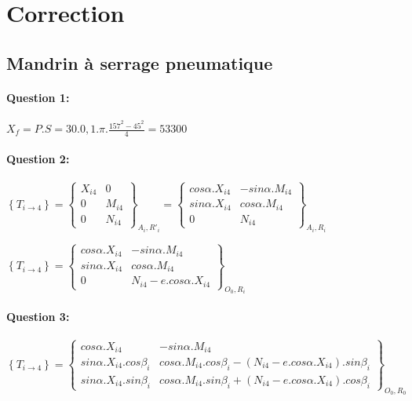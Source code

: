 \ifdef{\public}{}{}

\newpage

\section{Correction}

\subsection{Mandrin à serrage pneumatique}

\paragraph{Question 1:}

$X_f=P.S=30.0,1.\pi.\frac{157^2-45^2}{4}=53300$

\paragraph{Question 2:}

$\left\{T_{i\rightarrow 4}\right\}=\left\{\begin{array}{cc}
X_{i4} & 0 \\ 0 & M_{i4} \\  0 & N_{i4}
\end{array}\right\}_{A_i,R'_i}=\left\{\begin{array}{cc}
cos\alpha.X_{i4} & -sin\alpha.M_{i4} \\ sin\alpha.X_{i4} & cos\alpha.M_{i4} \\  0 & N_{i4}
\end{array}\right\}_{A_i,R_i}$

$\left\{T_{i\rightarrow 4}\right\}=\left\{\begin{array}{cc}
cos\alpha.X_{i4} & -sin\alpha.M_{i4} \\ sin\alpha.X_{i4} & cos\alpha.M_{i4} \\  0 & N_{i4}-e.cos\alpha.X_{i4}
\end{array}\right\}_{O_0,R_i}$

\paragraph{Question 3:}

$\left\{T_{i\rightarrow 4}\right\}=\left\{\begin{array}{cc}
cos\alpha.X_{i4} & -sin\alpha.M_{i4} \\ sin\alpha.X_{i4}.cos\beta_i & cos\alpha.M_{i4}.cos\beta_i-(N_{i4}-e.cos\alpha.X_{i4}).sin\beta_i \\ sin\alpha.X_{i4}.sin\beta_i & cos\alpha.M_{i4}.sin\beta_i+(N_{i4}-e.cos\alpha.X_{i4}).cos\beta_i
\end{array}\right\}_{O_0,R_0}$

